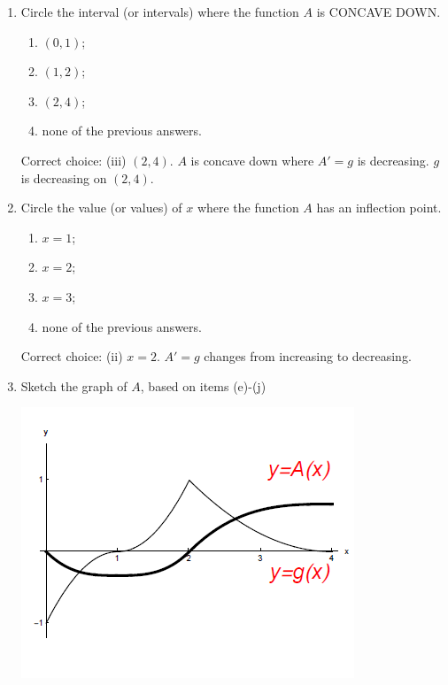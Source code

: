 \documentclass[nooutcomes,handout]{ximera}
\begin{document}
\begin{problem}
\begin{enumerate}
    \item
      Circle the interval (or intervals) where the function $A$ is CONCAVE DOWN.
      \begin{enumerate}
        \item $(0, 1)$;
        \item $(1, 2)$;
        \item $(2, 4)$;
        \item none of the previous answers.
      \end{enumerate}
      \begin{freeResponse}
        Correct choice: (iii) $(2, 4)$.  $A$ is concave down where $A'=g$ is decreasing.  $g$ is decreasing on $(2,4)$. 
      \end{freeResponse}

  \item
      Circle the value (or values) of $x$ where the function $A$ has an inflection point.
      \begin{enumerate}
        \item $x = 1$;
        \item $x = 2$;
        \item $x = 3$;
        \item none of the previous answers.
      \end{enumerate}
      \begin{freeResponse}
        Correct choice: (ii) $x=2$.  $A'=g$ changes from increasing to decreasing.
      \end{freeResponse}

  
  \item Sketch the graph of $A$, based on items (e)-(j)
  
        \begin{freeResponse} \hfil
                      \begin{image}
    \includegraphics[scale = 0.7]{figure4.png}
  \end{image}
      \end{freeResponse}
  
    \end{enumerate}
\end{problem}
\end{document}
